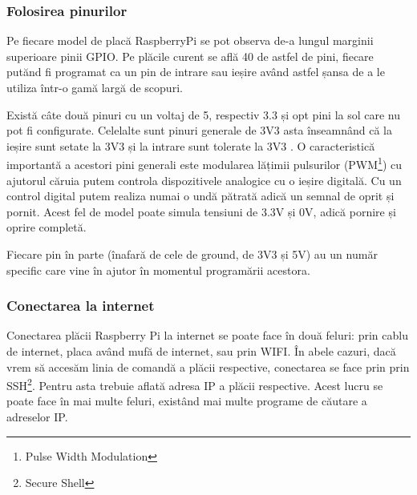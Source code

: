 \documentclass[../IoMusT.tex]{subfiles}
\begin{document}
\subsubsection{Folosirea pinurilor}
Pe fiecare model de placă RaspberryPi se pot observa de-a lungul marginii  superioare pinii GPIO. Pe plăcile curent se află 40 de astfel de pini, fiecare putănd fi programat ca un pin de intrare sau ieșire având astfel șansa de a le utiliza într-o gamă largă de scopuri.
\\
\par Există câte două pinuri cu un voltaj de 5, respectiv 3.3 și opt pini la sol care nu pot fi configurate. Celelalte sunt pinuri generale de 3V3 asta înseamnând că la ieșire sunt setate la 3V3 și la intrare sunt tolerate la 3V3 \cite{RaspPi}. O caracteristică importantă a acestori pini generali este modularea lățimii pulsurilor (PWM\footnote{Pulse Width Modulation}) cu ajutorul căruia putem controla dispozitivele analogice cu o ieșire digitală. Cu un control digital putem realiza numai o undă pătrată adică un semnal de oprit și pornit. Acest fel de model poate simula tensiuni de 3.3V și 0V, adică pornire și oprire completă. 
\\
\par Fiecare pin în parte (înafară de cele de ground, de 3V3 și 5V) au un număr specific care vine în ajutor în momentul programării acestora. 

\subsubsection{Conectarea la internet}
Conectarea plăcii Raspberry Pi la internet se poate face în două feluri: prin cablu de internet, placa având mufă de internet, sau prin WIFI. În abele cazuri, dacă vrem să accesăm linia de comandă a plăcii respective, conectarea se face prin prin SSH\footnote{Secure Shell}. Pentru asta trebuie aflată adresa IP a plăcii respective. Acest lucru se poate face în mai multe feluri, existând mai multe programe de căutare a adreselor IP. 
\end{document}
